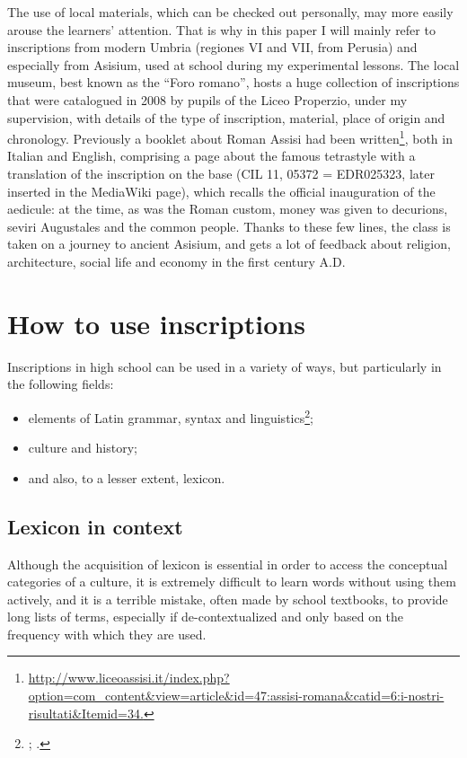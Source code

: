 \documentclass[amsthm,ebook]{saparticle}
\begin{document}
The use of local materials, which can be checked out personally, may more easily arouse the learners’ attention. That is
why in this paper I will mainly refer to inscriptions from modern Umbria (regiones VI and VII, from Perusia) and
especially from Asisium, used at school during my experimental lessons. The local museum, best known as the ``Foro
romano'', hosts a huge collection of inscriptions that were catalogued in 2008 by pupils of the Liceo Properzio, under
my supervision, with details of the type of inscription, material, place of origin and chronology. Previously a booklet
about Roman Assisi had been
written\footnote{\url{http://www.liceoassisi.it/index.php?option=com\_content\&view=article\&id=47:assisi-romana\&catid=6:i-nostri-risultati\&Itemid=34.}},
both in Italian and English, comprising a page about the famous tetrastyle with a translation of the inscription on the
base (CIL 11, 05372 = EDR025323, later inserted in the MediaWiki page), which recalls the official inauguration of the
aedicule: at the time, as was the Roman custom, money was given to decurions, seviri Augustales and the common people.
Thanks to these few lines, the class is taken on a journey to ancient Asisium, and gets a lot of feedback about
religion, architecture, social life and economy in the first century A.D.

\section{How to use inscriptions}
\noindent Inscriptions in high school can be used in a variety of ways, but particularly in the following fields:

\begin{itemize}
\item elements of Latin grammar, syntax and linguistics\footnote{\citet{Hartnett2012}; \citet{McCarthy1992}.};
\item culture and history;
\item and also, to a lesser extent, lexicon. 
\end{itemize}



\subsection{Lexicon in context}
\noindent Although the acquisition of lexicon is essential in order to access the conceptual categories of a culture, it is
extremely difficult to learn words without using them actively, and it is a terrible mistake, often made by school
textbooks, to provide long lists of terms, especially if de-contextualized and only based on the frequency with which
they are used.
\end{document}
